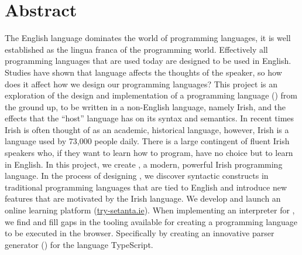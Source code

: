 \chapter{Abstract}
The English language dominates the world of programming languages, it is well established as the lingua franca of the programming world.
Effectively all programming languages that are used today are designed to be used in English.
Studies have shown that language affects the thoughts of the speaker, so how does it affect how we design our programming languages?
This project is an exploration of the design and implementation of a programming language (\Setanta{}) from the ground up, to be written in a non-English language, namely Irish, and the effects that the ``host'' language has on its syntax and semantics.
In recent times Irish is often thought of as an academic, historical language, however, Irish is a language used by 73,000 people daily. There is a large contingent of fluent Irish speakers who, if they want to learn how to program, have no choice but to learn in English.
In this project, we create \Setanta{}, a modern, powerful Irish programming language.
In the process of designing \Setanta{}, we discover syntactic constructs in traditional programming languages that are tied to English and introduce new features that are motivated by the Irish language.
We develop and launch an online learning platform (\href{https://try-setanta.ie}{try-setanta.ie}).
When implementing an interpreter for \Setanta{}, we find and fill gaps in the tooling available for creating a programming language to be executed in the browser.
Specifically by creating an innovative parser generator (\tsPEG{}) for the language TypeScript.
